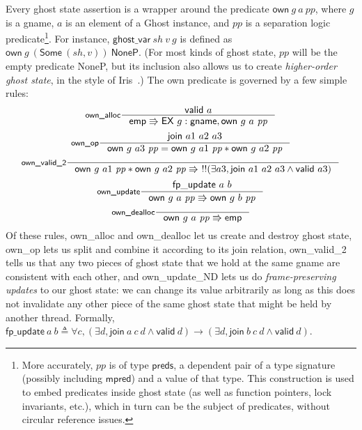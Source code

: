\documentclass[11pt]{article} %
\begin{document}
Every ghost state assertion is a wrapper around the predicate $\mathsf{own}\ g\ a\ \mathit{pp}$, where $g$ is a \textsf{gname}, $a$ is an element of a \textsf{Ghost} instance, and $\mathit{pp}$ is a separation logic predicate\footnote{More accurately, $\mathit{pp}$ is of type $\mathsf{preds}$, a dependent pair of a type signature (possibly including $\mathsf{mpred}$) and a value of that type. This construction is used to embed predicates inside ghost state (as well as function pointers, lock invariants, etc.), which in turn can be the subject of predicates, without circular reference issues.}. For instance, $\mathsf{ghost\_var}\ \mathit{sh}\ v\ g$ is defined as $\mathsf{own}\ g\ (\mathsf{Some}\ (\mathit{sh}, v))\ \mathsf{NoneP}$. (For most kinds of ghost state, $\mathit{pp}$ will be the empty predicate \textsf{NoneP}, but its inclusion also allows us to create \emph{higher-order ghost state}, in the style of Iris~\cite{hogs}.) The \textsf{own} predicate is governed by a few simple rules:
$$\inference[\textsf{own\_alloc}]{\mathsf{valid}\ a}{\mathsf{emp} \Rrightarrow \mathsf{EX}\ g : \mathsf{gname}, \mathsf{own}\ g\ a\ \mathit{pp}}$$
$$\inference[\textsf{own\_op}]{\mathsf{join}\ a1\ a2\ a3}{\mathsf{own}\ g\ a3\ \mathit{pp} = \mathsf{own}\ g\ a1\ \mathit{pp} * \mathsf{own}\ g\ a2\ \mathit{pp}}$$
$$\inference[\textsf{own\_valid\_2}]{}{\mathsf{own}\ g\ a1\ \mathit{pp} * \mathsf{own}\ g\ a2\ \mathit{pp} \Rrightarrow\ !!(\exists a3, \mathsf{join}\ a1\ a2\ a3 \land \mathsf{valid}\ a3)}$$
$$\inference[\textsf{own\_update}]{\mathsf{fp\_update}\ a\ b}{\mathsf{own}\ g\ a\ \mathit{pp} \Rrightarrow \mathsf{own}\ g\ b\ \mathit{pp}}$$
$$\inference[\textsf{own\_dealloc}]{}{\mathsf{own}\ g\ a\ \mathit{pp} \Rrightarrow \mathsf{emp}}$$
Of these rules, \textsf{own\_alloc} and \textsf{own\_dealloc} let us create and destroy ghost state, \textsf{own\_op} lets us split and combine it according to its \textsf{join} relation, \textsf{own\_valid\_2} tells us that any two pieces of ghost state that we hold at the same \textsf{gname} are consistent with each other, and \textsf{own\_update\_ND} lets us do \emph{frame-preserving updates} to our ghost state: we can change its value arbitrarily as long as this does not invalidate any other piece of the same ghost state that might be held by another thread. Formally, $\mathsf{fp\_update}\ a\ b \triangleq \forall c, (\exists d, \mathsf{join}\ a\ c\ d \land \mathsf{valid}\ d) \rightarrow (\exists d, \mathsf{join}\ b\ c\ d \land \mathsf{valid}\ d)$.
\end{document}
